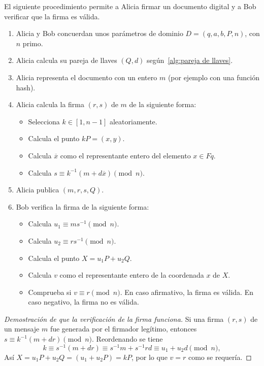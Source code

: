 \begin{protocolo}[ECDSA]\label{pc:ecdsa}
    El siguiente procedimiento permite a Alicia firmar un documento digital y a Bob verificar que la firma es válida.
    \begin{enumerate}
        \item Alicia y Bob concuerdan unos parámetros de dominio $D = (q, a, b, P, n)$, con $n$ primo.
        \item Alicia calcula su pareja de llaves $(Q, d)$ según~\ref{alg:pareja de llaves}.
        \item Alicia representa el documento con un entero $m$ (por ejemplo con una función hash).
        \item Alicia calcula la firma $(r, s)$ de $m$ de la siguiente forma:
        \begin{itemize}
            \item Selecciona $k \in [1, n - 1]$ aleatoriamente.
            \item Calcula el punto $k P = (x, y)$.
            \item Calcula $\overline{x}$ como el representante entero del elemento $x \in Fq$.
            \item Calcula $s \equiv k^{-1} (m + d \overline{x}) \pmod{n}$.
        \end{itemize}
        \item Alicia publica $(m, r, s, Q)$.
        \item Bob verifica la firma de la siguiente forma:
        \begin{itemize}
            \item Calcula $u_1 \equiv m s^{-1} \pmod{n}$.
            \item Calcula $u_2 \equiv r s^{-1} \pmod{n}$.
            \item Calcula el punto $X = u_1 P + u_2 Q$.
            \item Calcula $v$ como el representante entero de la coordenada $x$ de $X$.
            \item Comprueba si $v \equiv r \pmod{n}$. En caso afirmativo, la firma es válida. En caso negativo, la firma no es válida.
        \end{itemize}
    \end{enumerate}
\end{protocolo}
\begin{proof}[Demostración de que la verificación de la firma funciona]
Si una firma $(r, s)$ de un mensaje $m$ fue generada por el firmador legítimo, entonces $s \equiv k^{-1} (m + d r) \pmod{n}$. Reordenando se tiene
$$
    k \equiv s^{-1} (m + d r) \equiv s^{-1} m + s^{-1} r d \equiv u_1 + u_2 d \pmod{n},
$$
Así $X = u_1 P + u_2 Q = (u_1 + u_2 P) = k P$, por lo que $v = r$ como se requería.
\end{proof}

